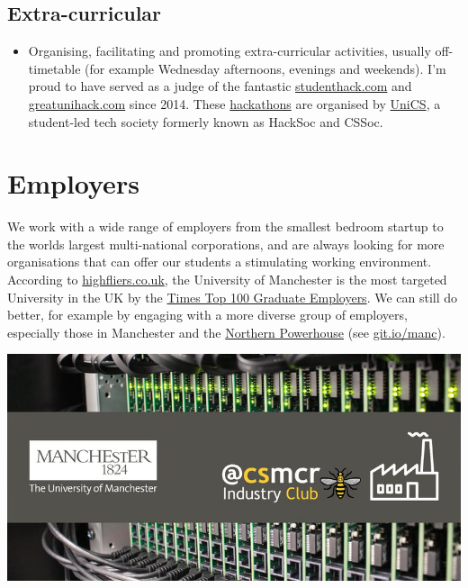 \documentclass[12pt,]{book}
\providecommand{\tightlist}{%
  \setlength{\itemsep}{0pt}\setlength{\parskip}{0pt}}
\begin{document}
\hypertarget{extra-curricular}{%
\section{Extra-curricular}\label{extra-curricular}}

\begin{itemize}
\tightlist
\item
  Organising, facilitating and promoting extra-curricular activities, usually off-timetable (for example Wednesday afternoons, evenings and weekends). I'm proud to have served as a judge of the fantastic \href{https://www.studenthack.com}{studenthack.com} and \href{https://greatunihack.com}{greatunihack.com} since 2014. These \href{https://medium.com/tfogo/hackathons-are-for-beginners-77a9c9c0e000}{hackathons} are organised by \href{https://www.unicsmcr.com/}{UniCS}, a student-led tech society formerly known as HackSoc and CSSoc.
\end{itemize}

\hypertarget{employers}{%
\chapter{Employers}\label{employers}}

We work with a wide range of employers from the smallest bedroom startup to the worlds largest multi-national corporations, and are always looking for more organisations that can offer our students a stimulating working environment. According to \href{https://www.highfliers.co.uk}{highfliers.co.uk}, the University of Manchester is the most targeted University in the UK by the \href{https://www.top100graduateemployers.com}{Times Top 100 Graduate Employers}. We can still do better, for example by engaging with a more diverse group of employers, especially those in Manchester and the \href{https://northernpowerhouse.gov.uk/}{Northern Powerhouse} (see \href{https://git.io/manc}{git.io/manc}).

\begin{center}\includegraphics[width=1\linewidth]{images/industry-club-wide} \end{center}
\end{document}
